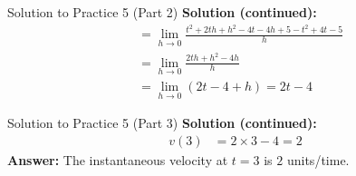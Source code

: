 \documentclass[aspectratio=169]{beamer}
\begin{document}
\begin{frame}{Solution to Practice 5 (Part 2)}
\textbf{Solution (continued):}
\[
\begin{aligned}
  &= \lim_{h \to 0} \frac{t^2 + 2th + h^2 - 4t - 4h + 5 - t^2 + 4t - 5}{h} \\
  &= \lim_{h \to 0} \frac{2th + h^2 - 4h}{h} \\
  &= \lim_{h \to 0} (2t - 4 + h) = 2t - 4
\end{aligned}
\]
\end{frame}

\begin{frame}{Solution to Practice 5 (Part 3)}
\textbf{Solution (continued):}
\[
\begin{aligned}
  v(3) &= 2 \times 3 - 4 = 2
\end{aligned}
\]
\textbf{Answer:} The instantaneous velocity at $t=3$ is $2$ units/time.
\end{frame}
\end{document}
